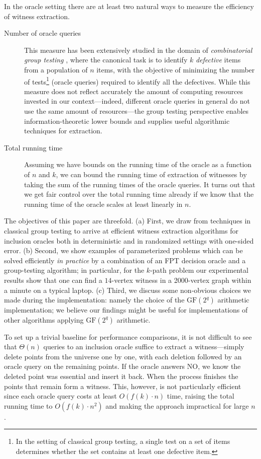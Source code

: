 \documentclass[11pt]{article}
\newcommand{\field}[1]{{\textrm{GF}}({#1})}
\begin{document}
In the oracle setting there are at least two natural ways to measure
the efficiency of witness extraction. 
\begin{description}
\item[Number of oracle queries]
This measure has been extensively studied in the domain
of {\em combinatorial group testing} \cite{DuHwang2000}, 
where the canonical task is to identify $k$ {\em defective} items 
from a population of $n$ items, with the objective of minimizing
the number of tests\footnote{In the setting of classical group testing, a single test 
on a set of items determines whether the set contains at least 
one defective item.}
(oracle queries) required to identify all the
defectives. While this measure does not reflect accurately the amount 
of computing resources invested in our context---indeed, different 
oracle queries in general do not use the same amount of resources---the 
group testing perspective enables information-theoretic lower
bounds and supplies useful algorithmic techniques for extraction.
\item[Total running time]
Assuming we have bounds on the running time of the oracle
as a function of $n$ and $k$, we can bound the running time 
of extraction of witnesses by taking the sum of
the running times of the oracle queries. It turns
out that we get fair control over the total running
time already if we know that the running time of the oracle 
scales at least linearly in $n$. 
\end{description}

The objectives of this paper are threefold. 
(a) First, we draw from techniques in classical group testing to arrive 
at efficient witness extraction algorithms for inclusion oracles both 
in deterministic and in randomized settings with one-sided error. 
(b) Second, we show examples of parameterized problems which can be solved efficiently {\em in practice} by 
a combination of an FPT decision oracle and a group-testing algorithm;
in particular, for the $k$-path problem our experimental results show that one can find a $14$-vertex witness in a 2000-vertex graph within a minute on a typical laptop. 
(c) Third, we discuss some non-obvious choices we made during the implementation: namely the choice of the $\field{2^q}$ arithmetic implementation; we believe our findings might be useful for implementations of other algorithms applying $\field{2^q}$ arithmetic.

To set up a trivial baseline for performance comparisons, it is not 
difficult to see that $\Theta(n)$ queries to an inclusion oracle suffice 
to extract a witness---simply delete points from the universe one by one, 
with each deletion followed by an oracle query on the remaining points. 
If the oracle answers NO, we know the deleted point was essential and 
insert it back. When the process finishes the points that remain form 
a witness. This, however, is not particularly efficient since each oracle 
query costs at least $O(f(k)\cdot n)$ time, raising the total running time 
to $O(f(k)\cdot n^2)$ and making the approach impractical for 
large $n$.
\end{document}
